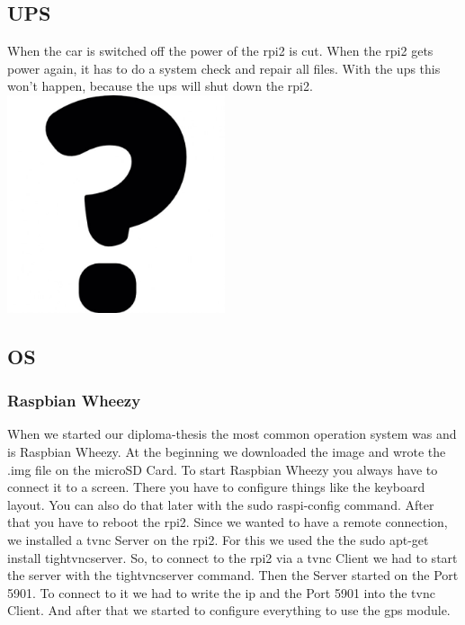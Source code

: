 \subsection{UPS}
When the car is switched off the power of the \gls{rpi2} is cut. When the \gls{rpi2} gets power again, it has to do a system check and repair all files. With the \gls{ups} this won’t happen, because the \gls{ups} will shut down the \gls{rpi2}.\newline
\includegraphics[width=0.48\textwidth]{bilder/USV}
\newpage
\subsection{OS}
\subsubsection{Raspbian Wheezy}
When we started our diploma-thesis the most common operation system was and is Raspbian Wheezy. At the beginning we downloaded the image and wrote the .img file on the microSD Card. To start Raspbian Wheezy you always have to connect it to a screen. There you have to configure things like the keyboard layout. You can also do that later with the sudo raspi-config command. After that you have to reboot the \gls{rpi2}.
Since we wanted to have a remote connection, we installed a \gls{tvnc} Server on the \gls{rpi2}. For this we used the the sudo apt-get install tightvncserver. So, to connect to the \gls{rpi2} via a \gls{tvnc} Client we had to start the server with the tightvncserver command. Then the Server started on the Port 5901. To connect to it we had to write the \gls{ip} and the Port 5901 into the \gls{tvnc} Client. And after that we started to configure everything to use the \gls{gps} module.
